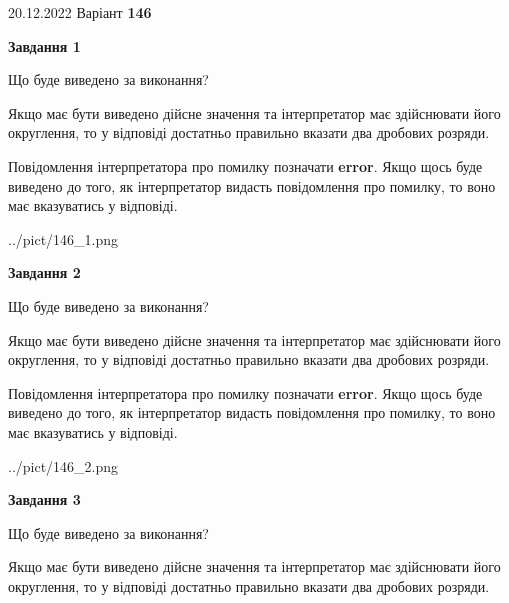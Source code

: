 \documentclass[12pt, ukrainian]{article}
\begin{document}
{20.12.2022 Варіант \No \textbf { 146 }\par}
{
\begin {Large}

{\begin {center}\textbf{Завдання 1}\end {center}}\par
Що буде виведено за виконання? \par

Якщо має бути виведено дійсне значення та інтерпретатор має здійснювати його округлення, 
то у відповіді достатньо правильно вказати два дробових розряди.

Повідомлення інтерпретатора про помилку позначати \textbf{error}.
Якщо щось буде виведено до того, як інтерпретатор видасть повідомлення про помилку, 
то воно має вказуватись у відповіді. \par

\begin{center}
	{../pict/146_1.png}
\end{center}
\newpage

{\begin {center}\textbf{Завдання 2}\end {center}}\par
Що буде виведено за виконання? \par

Якщо має бути виведено дійсне значення та інтерпретатор має здійснювати його округлення, 
то у відповіді достатньо правильно вказати два дробових розряди.

Повідомлення інтерпретатора про помилку позначати \textbf{error}.
Якщо щось буде виведено до того, як інтерпретатор видасть повідомлення про помилку, 
то воно має вказуватись у відповіді. \par

\begin{center}
	{../pict/146_2.png}
\end{center}
\newpage

{\begin {center}\textbf{Завдання 3}\end {center}}\par
Що буде виведено за виконання? \par

Якщо має бути виведено дійсне значення та інтерпретатор має здійснювати його округлення, 
то у відповіді достатньо правильно вказати два дробових розряди.


\end{Large}}
\end{document}
